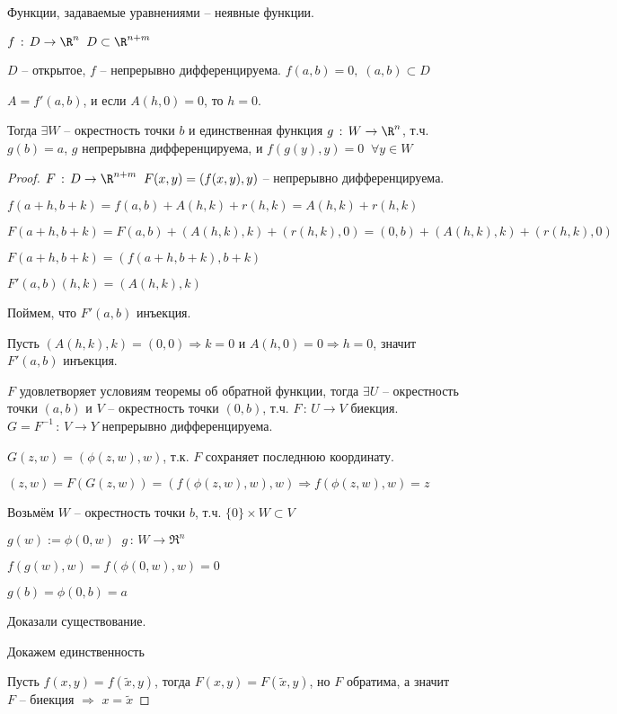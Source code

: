 
\begin{definition}\thmslashn
    
    Функции, задаваемые уравнениями -- неявные функции.
\end{definition}


\begin{theorem}\thmslashn
    
    $f \, : \, D \to \R^n \;\; D\subset \R^{n+m}$
    
    $D$ -- открытое, $f$ -- непрерывно дифференцируема. $f(a, b) = 0, \; (a,b) \subset D$
    
    $A = f'(a, b)$, и если $A(h, 0) = 0$, то $h = 0$.
    
    Тогда $\exists W$ -- окрестность точки $b$ и единственная функция $g\, : \, W \to \R^n$, т.ч. $g(b) = a$, $g$ непрерывна дифференцируема, и $f(g(y), y ) = 0 \;\; \forall y \in W$
\end{theorem}


\begin{proof}\thmslashn
    
    $F\, : \, D \to \R^{n+m} \;\; F(x,y) = (f(x,y), y)$ -- непрерывно дифференцируема.
    
    $f(a+h, b+k) = f(a,b) + A(h,k) + r(h, k) = A(h,k) + r(h, k)$
    
    $F(a+h, b+k) = F(a,b) + (A(h, k), k) + (r(h, k), 0) = (0, b) + (A(h, k), k) + (r(h, k), 0)$
    
    $F(a+h, b+k) = (f(a+h, b+k), b+k)$
    
    $F'(a, b)(h, k) = (A(h, k), k)$
    
    Поймем, что $F'(a, b)$ инъекция. 
    
    Пусть $(A(h, k), k) = (0, 0) \Rightarrow k = 0$ и $A(h, 0) = 0 \Rightarrow h = 0$, значит $F'(a, b)$ инъекция.
    
    $F$ удовлетворяет условиям теоремы об обратной функции, тогда $\exists U$ -- окрестность точки $(a,b)$ и $V$ -- окрестность точки $(0,b)$, т.ч. $F \,:\, U \to V$ биекция. $G = F^{-1} \, : \, V \to Y$ непрерывно дифференцируема.
    
    $G(z, w) = (\phi(z,w), w)$, т.к. $F$ сохраняет последнюю координату.
    
    $(z, w) = F(G(z, w)) = (f(\phi(z, w), w), w) \Rightarrow f(\phi(z, w), w) = z$
    
    Возьмём $W$ -- окрестность точки $b$, т.ч. $\{0\} \times W \subset V$
    
    $g(w) := \phi (0, w) \;\; g \,:\, W \to \Re^n$
    
    $f(g(w), w) = f(\phi(0, w), w) = 0$
    
    $g(b) = \phi(0, b) = a$
    
    Доказали существование.
    
    Докажем единственность
    
    Пусть $f(x, y) = f(\tilde{x}, y)$, тогда $F(x, y) = F(\tilde{x}, y)$, но $F$ обратима, а значит $F$ -- биекция $\Rightarrow$ $x = \tilde{x}$
    
\end{proof}
